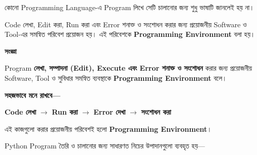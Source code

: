
কোনো Programming Language-এ Program লিখে সেটি চালানোর জন্য
শুধু ভাষাটি জানলেই হয় না।

Code লেখা, Edit করা, Run করা এবং Error শনাক্ত ও সংশোধন করার জন্য
প্রয়োজনীয় Software ও Tool-এর সমন্বিত পরিবেশ প্রয়োজন হয়।
এই পরিবেশকে \textbf{Programming Environment} বলা হয়।



\begin{definitionbox}

\textbf{\color{darkTeal}সংজ্ঞা}

Program \textbf{লেখা, সম্পাদনা (Edit), Execute এবং Error
শনাক্ত ও সংশোধন} করার জন্য প্রয়োজনীয় Software, Tool ও
সুবিধার সমন্বিত ব্যবস্থাকে \textbf{Programming Environment} বলে।

\end{definitionbox}

\textbf{সহজভাবে মনে রাখবে—}

\begin{center}

\textbf{Code লেখা}
\(\longrightarrow\)
\textbf{Run করা}
\(\longrightarrow\)
\textbf{Error দেখা}
\(\longrightarrow\)
\textbf{সংশোধন করা}

\end{center}

এই কাজগুলো করার প্রয়োজনীয় পরিবেশই হলো
\textbf{Programming Environment}।



Python Program তৈরি ও চালানোর জন্য সাধারণত নিচের
উপাদানগুলো ব্যবহৃত হয়—


